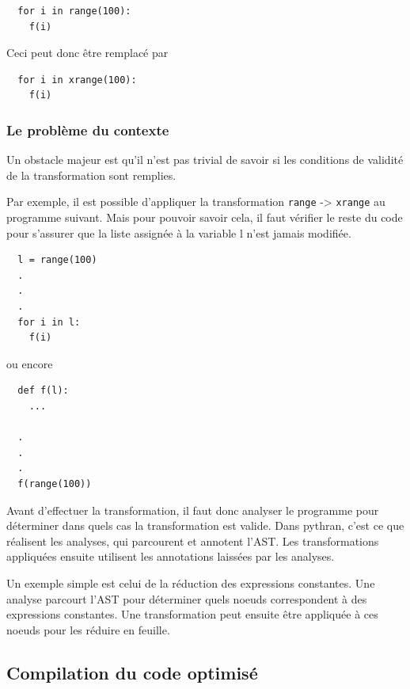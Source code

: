 \documentclass[a4paper]{article}
\begin{document}
\begin{lstlisting}
  for i in range(100):
    f(i)
\end{lstlisting}

Ceci peut donc être remplacé par

\begin{lstlisting}
  for i in xrange(100):
    f(i)
\end{lstlisting}

\subsubsection{Le problème du contexte}

Un obstacle majeur est qu'il n'est pas trivial de savoir si les
conditions de validité de la transformation sont remplies.

Par exemple, il est possible d'appliquer la transformation \texttt{range} ->
\texttt{xrange} au programme suivant. Mais pour pouvoir savoir cela, il faut
vérifier le reste du code pour s'assurer que la liste assignée à la
variable l n'est jamais modifiée.

\begin{lstlisting}
  l = range(100)
  .
  .
  .
  for i in l:
    f(i)
\end{lstlisting}

ou encore 

\begin{lstlisting}
  def f(l):
    ...

  .
  .
  .
  f(range(100))
\end{lstlisting}

Avant d'effectuer la transformation, il faut donc analyser le
programme pour déterminer dans quels cas la transformation est
valide. Dans pythran, c'est ce que réalisent les analyses, qui
parcourent et annotent l'AST. Les transformations appliquées ensuite
utilisent les annotations laissées par les analyses.

Un exemple simple est celui de la réduction des expressions
constantes. Une analyse parcourt l'AST pour déterminer quels noeuds
correspondent à des expressions constantes. Une transformation peut
ensuite être appliquée à ces noeuds pour les réduire en feuille.

\subsection{Compilation du code optimisé}

\label{Pythonicpp}
\end{document}
